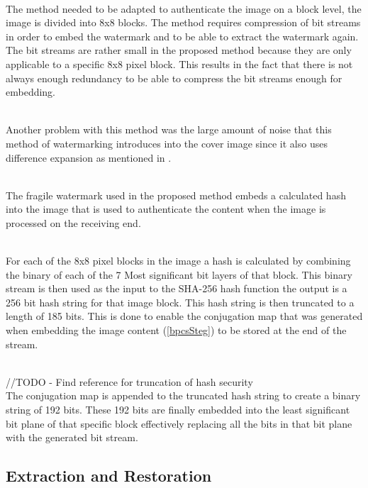 \documentclass[11pt]{article}
\begin{document}
\hspace{0pt} \\
The method needed to be adapted to authenticate the image on a block level, the image is divided into 8x8 blocks.
The method requires compression of bit streams in order to embed the watermark and to be able to extract the watermark again.
The bit streams are rather small in the proposed method because they are only applicable to a specific 8x8 pixel block. This results in the fact that there is not always enough redundancy to be able to compress the bit streams enough for embedding.

\hspace{0pt} \\
Another problem with this method was the large amount of noise that this method of watermarking introduces into the cover image since it also uses difference expansion as mentioned in \cite{tian2002reversible}.

\hspace{0pt} \\
The fragile watermark used in the proposed method embeds a calculated hash into the image that is used to authenticate the content when the image is processed on the receiving end.

\hspace{0pt} \\
For each of the 8x8 pixel blocks in the image a hash is calculated by combining the binary of each of the 7 Most significant bit layers of that block. This binary stream is then used as the input to the SHA-256 hash function the output is a 256 bit hash string for that image block.
This hash string is then truncated to a length of 185 bits.
This is done to enable the conjugation map that was generated when embedding the image content (\ref{bpcsSteg}) to be stored at the end of the stream.

\hspace{0pt} \\
//TODO - Find reference for truncation of hash security
\hspace{0pt} \\

The conjugation map is appended to the truncated hash string to create a binary string of 192 bits.
These 192 bits are finally embedded into the least significant bit plane of that specific block effectively replacing all the bits in that bit plane with the generated bit stream.

\subsection{Extraction and Restoration}
\end{document}
